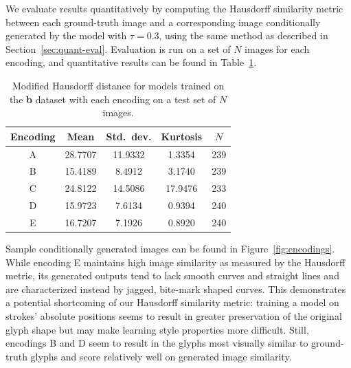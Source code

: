 We evaluate results quantitatively by computing the Hausdorff similarity metric between each ground-truth image and a corresponding image conditionally generated by the model with $\tau = 0.3$, using the same method as described in Section~\ref{sec:quant-eval}.
Evaluation is run on a set of $N$ images for each encoding, and quantitative results can be found in Table~\ref{tbl:encoding-results}.

\begin{table}[t]
\centering
\caption[Quantitative results for evaluating feature encodings]
    {Modified Hausdorff distance for models trained on the \textbf{b} dataset with each encoding on a test set of $N$ images.\label{tbl:encoding-results}}
\begin{tabular}{c c c c c}
\toprule
    Encoding & Mean & Std.\ dev. & Kurtosis & $N$ \\ \midrule
    A & 28.7707 & 11.9332 & 1.3354 & 239 \\
    B & 15.4189 & 8.4912 & 3.1740 & 239 \\
    C & 24.8122 & 14.5086 & 17.9476 & 233 \\
    D & 15.9723 & 7.6134 & 0.9394 & 240 \\
    E & 16.7207 & 7.1926 & 0.8920 & 240 \\
\end{tabular}
\end{table}

Sample conditionally generated images can be found in Figure~\ref{fig:encodings}.
While encoding E maintains high image similarity as measured by the Hausdorff metric, its generated outputs tend to lack smooth curves and straight lines and are characterized instead by jagged, bite-mark shaped curves.
This demonstrates a potential shortcoming of our Hausdorff similarity metric: training a model on strokes' absolute positions seems to result in greater preservation of the original glyph shape but may make learning style properties more difficult.
Still, encodings B and D seem to result in the glyphs most visually similar to ground-truth glyphs and score relatively well on generated image similarity.

